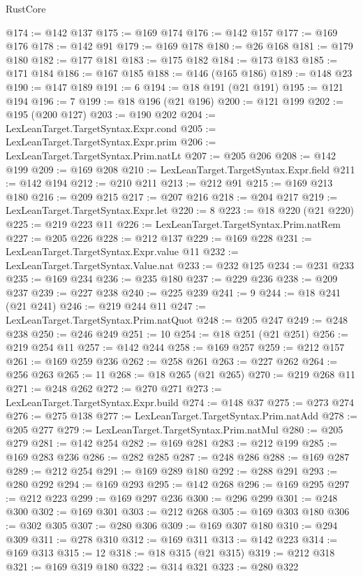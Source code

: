 \begin{lexlean}{RustCore}
\begin{coremodule}
@174 := @142 @137
@175 := @169 @174
@176 := @142 @157
@177 := @169 @176
@178 := @142 @91
@179 := @169 @178
@180 := @26 @168
@181 := @179 @180
@182 := @177 @181
@183 := @175 @182
@184 := @173 @183
@185 := @171 @184
@186 := @167 @185
@188 := @146 (@165 @186)
@189 := @148 @23
@190 := @147 @189
@191 := 6
@194 := @18 @191 (@21 @191)
@195 := @121 @194
@196 := 7
@199 := @18 @196 (@21 @196)
@200 := @121 @199
@202 := @195 (@200 @127)
@203 := @190 @202
@204 := LexLeanTarget.TargetSyntax.Expr.cond
@205 := LexLeanTarget.TargetSyntax.Expr.prim
@206 := LexLeanTarget.TargetSyntax.Prim.natLt
@207 := @205 @206
@208 := @142 @199
@209 := @169 @208
@210 := LexLeanTarget.TargetSyntax.Expr.field
@211 := @142 @194
@212 := @210 @211
@213 := @212 @91
@215 := @169 @213 @180
@216 := @209 @215
@217 := @207 @216
@218 := @204 @217
@219 := LexLeanTarget.TargetSyntax.Expr.let
@220 := 8
@223 := @18 @220 (@21 @220)
@225 := @219 @223 @11
@226 := LexLeanTarget.TargetSyntax.Prim.natRem
@227 := @205 @226
@228 := @212 @137
@229 := @169 @228
@231 := LexLeanTarget.TargetSyntax.Expr.value @11
@232 := LexLeanTarget.TargetSyntax.Value.nat
@233 := @232 @125
@234 := @231 @233
@235 := @169 @234
@236 := @235 @180
@237 := @229 @236
@238 := @209 @237
@239 := @227 @238
@240 := @225 @239
@241 := 9
@244 := @18 @241 (@21 @241)
@246 := @219 @244 @11
@247 := LexLeanTarget.TargetSyntax.Prim.natQuot
@248 := @205 @247
@249 := @248 @238
@250 := @246 @249
@251 := 10
@254 := @18 @251 (@21 @251)
@256 := @219 @254 @11
@257 := @142 @244
@258 := @169 @257
@259 := @212 @157
@261 := @169 @259 @236
@262 := @258 @261
@263 := @227 @262
@264 := @256 @263
@265 := 11
@268 := @18 @265 (@21 @265)
@270 := @219 @268 @11
@271 := @248 @262
@272 := @270 @271
@273 := LexLeanTarget.TargetSyntax.Expr.build
@274 := @148 @37
@275 := @273 @274
@276 := @275 @138
@277 := LexLeanTarget.TargetSyntax.Prim.natAdd
@278 := @205 @277
@279 := LexLeanTarget.TargetSyntax.Prim.natMul
@280 := @205 @279
@281 := @142 @254
@282 := @169 @281
@283 := @212 @199
@285 := @169 @283 @236
@286 := @282 @285
@287 := @248 @286
@288 := @169 @287
@289 := @212 @254
@291 := @169 @289 @180
@292 := @288 @291
@293 := @280 @292
@294 := @169 @293
@295 := @142 @268
@296 := @169 @295
@297 := @212 @223
@299 := @169 @297 @236
@300 := @296 @299
@301 := @248 @300
@302 := @169 @301
@303 := @212 @268
@305 := @169 @303 @180
@306 := @302 @305
@307 := @280 @306
@309 := @169 @307 @180
@310 := @294 @309
@311 := @278 @310
@312 := @169 @311
@313 := @142 @223
@314 := @169 @313
@315 := 12
@318 := @18 @315 (@21 @315)
@319 := @212 @318
@321 := @169 @319 @180
@322 := @314 @321
@323 := @280 @322

\end{coremodule}
\end{lexlean}
